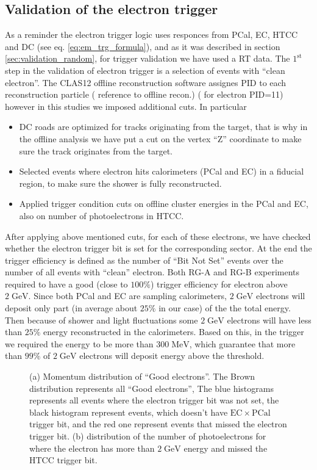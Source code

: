 \subsection{Validation of the electron trigger}
As a reminder the electron trigger logic uses responces from PCal, EC, HTCC and DC (see eq. \ref{eq:em_trg_formula}), and as it was described in section \ref{sec:validation_random}, for trigger validation we have used a RT data. 
The $\mathrm{1^{st}}$ step in the validation of electron trigger is a selection of  events with ``clean electron''. The CLAS12 offline reconstruction software assignes PID to each reconstruction particle ({\color{Red} reference to offline recon.}) ( for electron PID=11) however in this studies we imposed additional cuts. 
In particular 
\begin{itemize}
 \item DC roads are optimized for tracks originating from the target, that is why in the offline analysis we have put a cut on the vertex ``Z'' coordinate to make sure the track originates from the target.
 \item Selected events where electron hits calorimeters (PCal and EC) in a fiducial region, to make sure the shower is fully reconstructed.
 \item Applied trigger condition cuts on offline cluster energies in the PCal and EC, also on number of photoelectrons in HTCC.
\end{itemize}
After applying above mentioned cuts, for each of these electrons, we have checked whether the electron trigger bit is set for the corresponding sector. At the end the trigger efficiency is defined as the number of ``Bit Not Set'' events over the number of all events with ``clean'' electron.
Both RG-A and RG-B experiments required to have a good (close to $100 \%$) trigger efficiency for electron above $\mathrm{2\;GeV}$. Since both PCal and EC are sampling calorimeters, $\mathrm{2\;GeV}$ electrons will deposit only part (in average about $25\%$ in our case) of the the total energy. Then because of shower and light fluctuations some $\mathrm{2\;GeV}$ electrons will have less than $\mathrm{25\%}$ energy reconstructed in the calorimeters. Based on this, in the trigger we required the energy to be more than $\mathrm{300 \; MeV}$, which guarantee that more than $\mathrm{99\%}$ of $\mathrm{2\;GeV}$ electrons will deposit energy above the threshold.
\begin{figure}[!htb]
 \centering
 \caption{(a) Momentum distribution of ``Good electrons''. The Brown distribution represents all ``Good electrons'', The blue histograms represents all events where the electron trigger bit was not set, the black histogram represent events, which doesn't have $\mathrm{EC}\times \mathrm{PCal}$ trigger bit, and the red one represent events that missed the electron trigger bit. (b) distribution of the number of photoelectrons for where the electron has more than $\mathrm{2\;GeV}$ energy and missed the HTCC trigger bit.}
 \label{fig:em_missed_events}
\end{figure}
